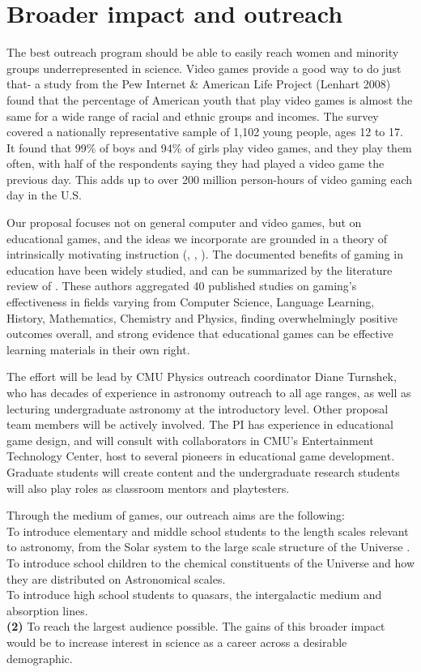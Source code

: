 \section{Broader impact and outreach}

The best outreach program should be able to easily reach women and
minority groups underrepresented in science. Video games provide
a good way to do just that- a  study from the  Pew Internet 
\& American Life 
Project (Lenhart 2008) found that the percentage of American youth
that play video games is almost the same for a wide range of racial and
ethnic groups and incomes. The survey covered a
 nationally representative sample of 1,102 young people, ages 12 to 
17. It found that 99\% of boys and 94\% of girls
play video games, and they play them often, with  half of the respondents 
saying they had played a video game the previous day. This adds up to
over 200 million person-hours of video gaming each day in the U.S.

Our proposal 
focuses not on general computer and video games, but on educational games,
and the ideas we incorporate are 
grounded in a theory of intrinsically motivating instruction 
(\cite{Gee03},
\cite{Squire03}, \cite{Schell08}). The documented benefits of gaming
in education have been widely studied, and can be summarized by the 
literature review of \cite{Backlund}. These authors aggregated 40 published
studies on 
gaming's effectiveness in fields varying from Computer Science, 
Language Learning, History, Mathematics, Chemistry and Physics, finding 
overwhelmingly positive outcomes overall, and strong evidence that 
educational games can be effective learning materials in their own right.

The effort will be lead by CMU Physics outreach coordinator Diane 
Turnshek, who has decades of
experience in astronomy outreach to all age ranges, as well
as lecturing undergraduate astronomy at the introductory level.
Other proposal team members will be actively involved. The PI has
experience in educational game design, and will consult with collaborators
in CMU's Entertainment Technology Center, host to several pioneers in 
educational game development. Graduate students will create content
and the undergraduate research students will also play roles
as  classroom mentors and playtesters.




Through the medium of  games, our outreach aims are the following:\\
 To introduce  elementary and middle
school students to the length scales relevant
to astronomy, from the Solar system to the large scale structure of the Universe
.\\
  To introduce school children to the chemical constituents
 of the Universe and how they are distributed on Astronomical scales.\\
 To introduce high school students to 
 quasars, the  intergalactic medium and absorption lines.\\
{\bf (2)}
To reach the largest audience possible. 
 The gains of this broader 
impact would be to increase interest in science as a career across 
a desirable demographic.

